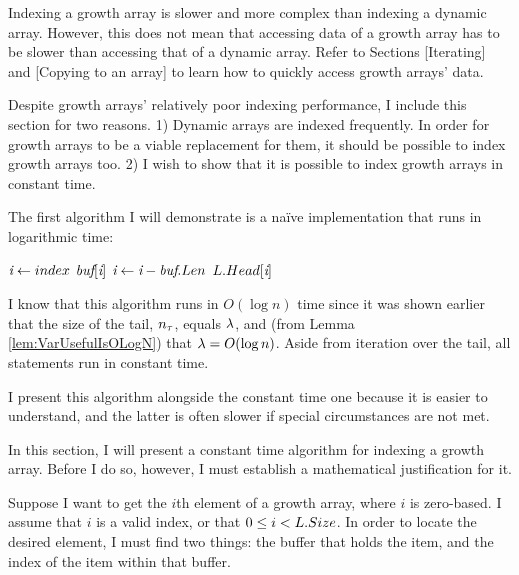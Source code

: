 \HdrGrowthArrayImpl

Indexing a growth array is slower and more complex than indexing a dynamic array. However, this does not mean that accessing data of a growth array has to be slower than accessing that of a dynamic array. Refer to Sections [Iterating] and [Copying to an array] to learn how to quickly access growth arrays' data.

Despite growth arrays' relatively poor indexing performance, I include this section for two reasons. 1) Dynamic arrays are indexed frequently. In order for growth arrays to be a viable replacement for them, it should be possible to index growth arrays too. 2) I wish to show that it is possible to index growth arrays in constant time.

\HdrLogarithmicImpl

The first algorithm I will demonstrate is a na\"{i}ve implementation that runs in logarithmic time:

\begin{algorithm}
	\begin{algorithmic}
			\State $\textit{i} \gets index$
					\State \Return $\textit{buf}[\textit{i}]$
				\EndIf
				\State $\textit{i} \gets \textit{i} - \textit{buf}.Len$
			\EndFor
			\State \Return $L.Head[\textit{i}]$
		\EndFunction
	\end{algorithmic}
\end{algorithm}

I know that this algorithm runs in $O(\log n)$ time since it was shown earlier that the size of the tail, $n_\tau$, equals $\lambda$, and (from Lemma \ref{lem:VarUsefulIsOLogN}) that $\lambda = O(\log n)$. Aside from iteration over the tail, all statements run in constant time.

I present this algorithm alongside the constant time one because it is easier to understand, and the latter is often slower if special circumstances are not met.

\HdrConstantImpl

In this section, I will present a constant time algorithm for indexing a growth array. Before I do so, however, I must establish a mathematical justification for it.

Suppose I want to get the $i$th element of a growth array, where $i$ is zero-based. I assume that $i$ is a valid index, or that $0 \leq i < L.Size$. In order to locate the desired element, I must find two things: the buffer that holds the item, and the index of the item within that buffer.


